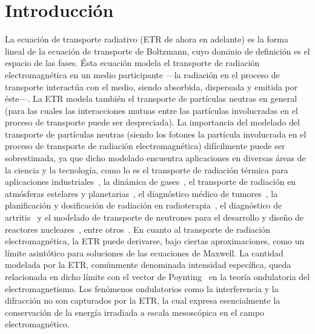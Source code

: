 \pagestyle{fancy}
\chapter{Introducción}
\lhead{\thepage}
\vspace{0.01\textheight}
\pagebreak

La ecuación de transporte radiativo (ETR de ahora en adelante) es la forma lineal de la ecuación de transporte de Boltzmann, 
cuyo dominio de definición es el espacio de las fases. Ésta ecuación modela el transporte 
de radiación electromagnética en un medio participante ---la radiación en el proceso de transporte 
interactúa con el medio, siendo absorbida, dispersada y emitida por éste---. La ETR modela también el transporte de partículas neutras en
 general (para las cuales las interacciones mutuas entre las partículas involucradas 
 en el proceso de transporte puede ser despreciada). La importancia del modelado del transporte de 
 partículas neutras (siendo los fotones la partícula involucrada en el proceso de transporte de 
 radiación electromagnética) difícilmente puede ser sobrestimada, ya que dicho modelado encuentra aplicaciones en diversas
 áreas de la ciencia y la tecnología, como lo es el transporte de radiación 
 térmica para aplicaciones industriales~\cite{Howell2010, Thynell1998}, la dinámica de 
 gases~\cite{Duderstadt1979}, el transporte de radiación en atmósferas estelares y 
 planetarias~\cite{Qin2015, Dymond1997, Chandrasekhar1960}, el diagnóstico médico de 
 tumores~\cite{Zhu2005, Zhu2010, Fujii2016b}, la planificación y dosificación 
 de radiación en radioterapia~\cite{Vassiliev2010,Bedford2019}, el diagnóstico de artritis~\cite{Klose2002, Netz2001} 
 y el modelado de transporte de neutrones para el desarrollo 
 y diseño de reactores nucleares~\cite{Larsen2006, Sanchez1982, Anli2006}, entre otros~\cite {Mishchenko1999, Prasher2003}. 
 En cuanto al transporte de radiación electromagnética, la ETR puede derivarse, bajo ciertas aproximaciones, como un límite asintótico 
 para soluciones de las ecuaciones de Maxwell. La cantidad modelada por la ETR, comúnmente denominada 
 intensidad específica, queda relacionada en dicho límite con el vector de Poynting~\cite{Mishchenko2002, Ripoll2011} 
 en la teoría ondulatoria del electromagnetismo. Los fenómenos ondulatorios como la interferencia y la difracción no son
 capturados por la ETR, la cual expresa esencialmente la conservación de la
 energía irradiada a escala mesoscópica en el campo electromagnético.

